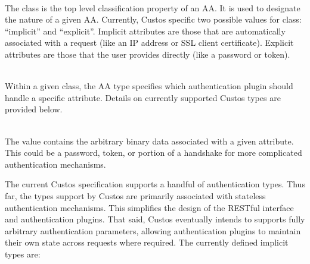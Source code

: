 \begin{packed_desc}
\item[Class] \hfill \\ The class is the top level classification
  property of an AA. It is used to designate the nature of a given
  AA. Currently, Custos specific two possible values for class:
  ``implicit'' and ``explicit''. Implicit attributes are those that
  are automatically associated with a request (like an IP address or SSL
  client certificate). Explicit attributes are those that the user
  provides directly (like a password or token).
\item[Type] \hfill \\ Within a given class, the AA type specifies which
  authentication plugin should handle a specific attribute. Details on
  currently supported Custos types are provided below.
\item[Value] \hfill \\ The value contains the arbitrary binary data
  associated with a given attribute. This could be a password, token,
  or portion of a handshake for more complicated authentication
  mechanisms.
\end{packed_desc}

The current Custos specification supports a handful of authentication
types. Thus far, the types support by Custos are primarily associated
with stateless authentication mechanisms. This simplifies the design
of the RESTful interface and authentication plugins. That said, Custos
eventually intends to supports fully arbitrary authentication
parameters, allowing authentication plugins to maintain their own
state across requests where required. The currently defined implicit
types are:

